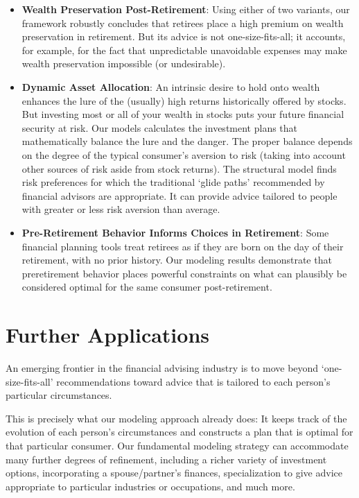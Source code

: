 \documentclass{article}
\begin{document}
\begin{itemize}
\item \textbf{Wealth Preservation Post-Retirement}: Using either of two variants, our framework robustly concludes that retirees place a high premium on wealth preservation in retirement. But its advice is not one-size-fits-all; it accounts, for example, for the fact that unpredictable unavoidable expenses may make wealth preservation impossible (or undesirable).


\item \textbf{Dynamic Asset Allocation}: An intrinsic desire to hold onto wealth enhances the lure of the (usually) high returns historically offered by stocks. But investing most or all of your wealth in stocks puts your future financial security at risk.  Our models calculates the investment plans that mathematically balance the lure and the danger.  The proper balance depends on the degree of the typical consumer's aversion to risk (taking into account other sources of risk aside from stock returns).  The structural model finds risk preferences for which the traditional `glide paths' recommended by financial advisors are appropriate. It can provide advice tailored to people with greater or less risk aversion than average.


\item \textbf{Pre-Retirement Behavior Informs Choices in Retirement}: Some financial planning tools treat retirees as if they are born on the day of their retirement, with no prior history.  Our modeling results demonstrate that preretirement behavior places powerful constraints on what can plausibly be considered optimal for the same consumer post-retirement.
\end{itemize}

\section{Further Applications}

An emerging frontier in the financial advising industry is to move beyond `one-size-fits-all' recommendations toward advice that is tailored to each person's particular circumstances.

This is precisely what our modeling approach already does: It keeps track of the evolution of each person's circumstances and constructs a plan that is optimal for that particular consumer. Our fundamental modeling strategy can accommodate many further degrees of refinement, including a richer variety of investment options, incorporating a spouse/partner's finances, specialization to give advice appropriate to particular industries or occupations, and much more.
\end{document}
